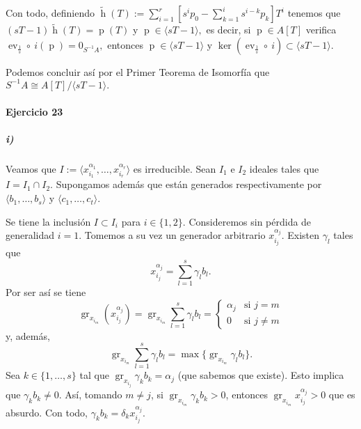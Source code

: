 \documentclass[../main.tex]{subfiles}
\begin{document}
Con todo, definiendo $\widetilde{\operatorname{h}}(T):=\sum_{i=1}^r\left[s^ip_0-\sum_{k=1}^is^{i-k}p_k\right]T^i$ tenemos que $(sT-1)\widetilde{\operatorname{h}}(T)=\operatorname{p}(T)$ y $\operatorname{p}\in\langle sT-1\rangle,$ es decir, si $\operatorname{p}\in A[T]$ verifica $\operatorname{ev}_{\frac{1}{s}}\circ\ i(\operatorname{p})=0_{S^{-1}A},$ entonces $\operatorname{p}\in \langle sT-1\rangle$ y $\ker(\operatorname{ev}_{\frac{1}{s}}\circ\ i)\subset\langle sT-1\rangle.$

Podemos concluir así por el Primer Teorema de Isomorfía que $S^{-1}A\cong A[T]/\langle sT-1\rangle.$






 
\paragraph{Ejercicio 23}
\subparagraph{i)} Veamos que $I:=\langle x_{i_1}^{\alpha_1},\dots,x_{i_r}^{\alpha_r}\rangle$ es irreducible. Sean $I_1$ e $I_2$ ideales tales que $I=I_1\cap I_2.$ Supongamos además que están generados respectivamente por $\langle b_1,\dots,b_s\rangle$ y $\langle c_1,\dots,c_t\rangle.$

Se tiene la inclusión $I\subset I_i$ para $i\in\{1,2\}.$ Consideremos sin pérdida de generalidad $i=1.$ Tomemos a su vez un generador arbitrario $x_{i_j}^{\alpha_j}.$ Existen $\gamma_l$ tales que
$$x_{i_j}^{\alpha_j}=\sum_{l=1}^s\gamma_l b_l.$$
Por ser así se tiene
$$\operatorname{gr}_{x_{i_m}}(x_{i_j}^{\alpha_j})=\operatorname{gr}_{x_{i_m}}{\sum_{l=1}^s\gamma_l b_l}=\left\{\begin{array}{cc}
    \alpha_j&\text{si }j=m\\
    0&\text{si }j\neq m
\end{array}\right.$$
y, además,
$$\operatorname{gr}_{x_{i_m}}{\sum_{l=1}^s\gamma_l b_l}=\max\{\operatorname{gr}_{x_{i_m}}\gamma_l b_l\}.$$
Sea $k\in\{1,\dots,s\}$ tal que $\operatorname{gr}_{x_{i_j}}\gamma_kb_k=\alpha_j$ (que sabemos que existe). Esto implica que $\gamma_k b_k\neq 0.$ Así, tomando $m\neq j$, si $\operatorname{gr}_{x_{i_m}}\gamma_k b_k>0$, entonces $\operatorname{gr}_{x_{i_m}}x_{i_j}^{\alpha_j}>0$ que es absurdo. Con todo, $\gamma_kb_k=\delta_k x_{i_j}^{\alpha_j}.$
\end{document}
